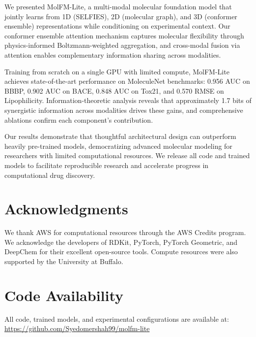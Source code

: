 \documentclass[11pt]{article}
\newcommand{\modelname}{MolFM-Lite}
\begin{document}
We presented \modelname{}, a multi-modal molecular foundation model that jointly learns from 1D (SELFIES), 2D (molecular graph), and 3D (conformer ensemble) representations while conditioning on experimental context. Our conformer ensemble attention mechanism captures molecular flexibility through physics-informed Boltzmann-weighted aggregation, and cross-modal fusion via attention enables complementary information sharing across modalities.

Training from scratch on a single GPU with limited compute, \modelname{} achieves state-of-the-art performance on MoleculeNet benchmarks: 0.956 AUC on BBBP, 0.902 AUC on BACE, 0.848 AUC on Tox21, and 0.570 RMSE on Lipophilicity. Information-theoretic analysis reveals that approximately 1.7 bits of synergistic information across modalities drives these gains, and comprehensive ablations confirm each component's contribution.

Our results demonstrate that thoughtful architectural design can outperform heavily pre-trained models, democratizing advanced molecular modeling for researchers with limited computational resources. We release all code and trained models to facilitate reproducible research and accelerate progress in computational drug discovery.

\section*{Acknowledgments}

We thank AWS for computational resources through the AWS Credits program. We acknowledge the developers of RDKit, PyTorch, PyTorch Geometric, and DeepChem for their excellent open-source tools. Compute resources were also supported by the University at Buffalo.

\section*{Code Availability}

All code, trained models, and experimental configurations are available at: \url{https://github.com/Syedomershah99/molfm-lite}
\end{document}
